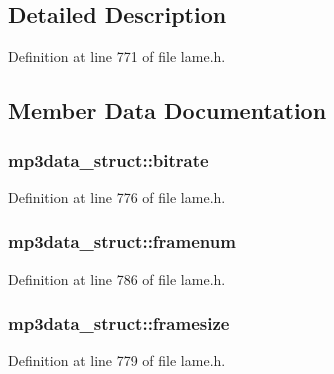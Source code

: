 \subsection{Detailed Description}


Definition at line 771 of file lame.\+h.



\subsection{Member Data Documentation}
\subsubsection[{\texorpdfstring{bitrate}{bitrate}}]{ mp3data\+\_\+struct\+::bitrate}\hypertarget{structmp3data__struct_aa3df8d515c5f2a1452da71c720831c84}{}\label{structmp3data__struct_aa3df8d515c5f2a1452da71c720831c84}


Definition at line 776 of file lame.\+h.

\subsubsection[{\texorpdfstring{framenum}{framenum}}]{ mp3data\+\_\+struct\+::framenum}\hypertarget{structmp3data__struct_a6a8024612331fe1bc8932a322d85cefb}{}\label{structmp3data__struct_a6a8024612331fe1bc8932a322d85cefb}


Definition at line 786 of file lame.\+h.

\subsubsection[{\texorpdfstring{framesize}{framesize}}]{ mp3data\+\_\+struct\+::framesize}\hypertarget{structmp3data__struct_ace17958ccd3aac5df08568ab1a224063}{}\label{structmp3data__struct_ace17958ccd3aac5df08568ab1a224063}


Definition at line 779 of file lame.\+h.


